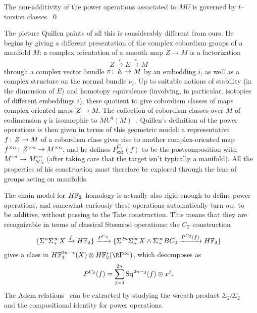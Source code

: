 \begin{corollary}
The non-additivity of the power operations associated to \(MU\) is governed by \(t\)--torsion classes. \qed
\end{corollary}

\begin{remark}
The picture Quillen paints of all this is considerably different from ours.  He begins by giving a different presentation of the complex cobordism groups of a manifold \(M\): a complex orientation of a smooth map \(Z \to M\) is a factorization \[Z \xrightarrow{i} E \xrightarrow{\pi} M\] through a complex vector bundle \(\pi\colon\thinspace E \to M\) by an embedding \(i\), as well as a complex structure on the normal bundle \(\nu_i\).  Up to suitable notions of stability (in the dimension of \(E\)) and homotopy equivalence (involving, in particular, isotopies of different embeddings \(i\)), these quotient to give cobordism classes of maps complex-oriented maps \(Z \to M\).  The collection of cobordism classes over \(M\) of codimension \(q\) is isomorphic to \(MU^q(M)\)~\cite[Proposition 1.2]{Quillen}.  Quillen's definition of the power operations is then given in terms of this geometric model: a representative \(f\colon\thinspace Z \to M\) of a cobordism class gives rise to another complex-oriented map \(f^{\times n}\colon\thinspace Z^{\times n} \to M^{\times n}\), and he defines \(P^{C_n}_{\mathrm{ext}}(f)\) to be the postcomposition with \(M^{\times n} \to M^{\times n}_{hC_n}\) (after taking care that the target isn't typically a manifold).  All the properties of his construction must therefore be explored through the lens of groups acting on manifolds.
\end{remark}

\begin{example}
The chain model for \(\HFtwo\)--homology is actually also rigid enough to define power operations, and somewhat curiously these operations automatically turn out to be additive, without passing to the Tate construction.  This means that they are recognizable in terms of classical Steenrod operations: the \(C_2\)--construction \[\{\Susp^n \Susp^\infty_+ X \xrightarrow{f} \HFtwo\} \xrightarrow{P^{C_2}} \{\Susp^{2n} \Susp^\infty_+ X \sm \Susp^\infty_+ BC_2 \xrightarrow{P^{C_2}(f)} \HFtwo\}\] gives a class in \(\HFtwo^{2n-*}(X) \otimes \HFtwo^*(\RP^\infty)\), which decomposes as \[P^{C_2}(f) = \sum_{j=0}^{2n} \operatorname{Sq}^{2n-j}(f) \otimes x^j.\]  The Adem relations~\cite{Adem} can be extracted by studying the wreath product \(\Sigma_2 \wr \Sigma_2\) and the compositional identity for power operations.
\end{example}

